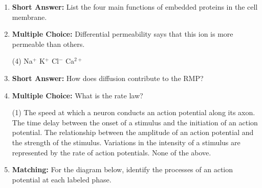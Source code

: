 \begin{enumerate}[label=\textbf{Q2.3.\arabic*}]
      \item \textbf{Short Answer:} List the four main functions of embedded proteins in the cell membrane. \\

      \item \textbf{Multiple Choice:} Differential permeability says that this ion is more permeable than others. 
      \begin{tasks}[label=\textcolor{\documentTheme}{(\Alph*)}, item-format=\color{\documentTheme}, label-width=1.5em, item-indent=1.7em](4)
            \task Na\(^{+}\)
            \task K\(^{+}\)
            \task Cl\(^{-}\)
            \task Ca\(^{2+}\)
      \end{tasks}

      \item \textbf{Short Answer:} How does diffusion contribute to the RMP? \\

      \item \textbf{Multiple Choice:} What is the rate law? 
            \begin{tasks}[label=\textcolor{\documentTheme}{(\Alph*)}, item-format=\color{\documentTheme}, label-width=1.5em, item-indent=1.7em](1)
                  \task The speed at which a neuron conducts an action potential along its axon.
                  \task The time delay between the onset of a stimulus and the initiation of an action potential.
                  \task The relationship between the amplitude of an action potential and the strength of the stimulus.
                  \task Variations in the intensity of a stimulus are represented by the rate of action potentials.
                  \task None of the above.
            \end{tasks}


      \newpage 

      \item \textbf{Matching:} For the diagram below, identify the processes of an action potential at each labeled phase.


\end{enumerate}
